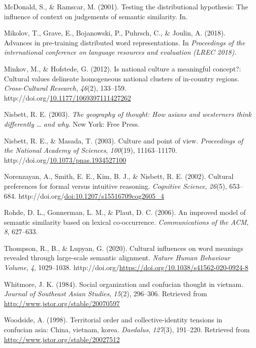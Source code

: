 \documentclass[10pt, letterpaper]{article}
\newenvironment{CSLReferences}%
  {}%
  {\par}
\begin{document}
\begin{CSLReferences}{1}{0}
\leavevmode{}%
McDonald, S., \& Ramscar, M. (2001). Testing the distributional
hypothesis: The influence of context on judgements of semantic
similarity. In.

\leavevmode{}%
Mikolov, T., Grave, E., Bojanowski, P., Puhrsch, C., \& Joulin, A.
(2018). Advances in pre-training distributed word representations. In
\emph{Proceedings of the international conference on language resources
and evaluation (LREC 2018)}.

\leavevmode{}%
Minkov, M., \& Hofstede, G. (2012). Is national culture a meaningful
concept?: Cultural values delineate homogeneous national clusters of
in-country regions. \emph{Cross-Cultural Research}, \emph{46}(2),
133--159.
http://doi.org/\href{https://doi.org/10.1177/1069397111427262}{10.1177/1069397111427262}

\leavevmode{}%
Nisbett, R. E. (2003). \emph{The geography of thought: How asians and
westerners think differently {\ldots{}} and why}. New York: Free Press.

\leavevmode{}%
Nisbett, R. E., \& Masada, T. (2003). Culture and point of view.
\emph{Proceedings of the National Academy of Sciences}, \emph{100}(19),
11163--11170.
http://doi.org/\href{https://doi.org/10.1073/pnas.1934527100}{10.1073/pnas.1934527100}

\leavevmode{}%
Norenzayan, A., Smith, E. E., Kim, B. J., \& Nisbett, R. E. (2002).
Cultural preferences for formal versus intuitive reasoning.
\emph{Cognitive Science}, \emph{26}(5), 653--684.
http://doi.org/\href{https://doi.org/doi:10.1207/s15516709cog2605_4}{doi:10.1207/s15516709cog2605\_4}

\leavevmode{}%
Rohde, D. L., Gonnerman, L. M., \& Plaut, D. C. (2006). An improved
model of semantic similarity based on lexical co‐occurrence.
\emph{Communications of the ACM}, \emph{8}, 627--633.

\leavevmode{}%
Thompson, R., B., \& Lupyan, G. (2020). Cultural influences on word
meanings revealed through large-scale semantic alignment. \emph{Nature
Human Behaviour Volume}, \emph{4}, 1029--1038.
http://doi.org/\url{https://doi.org/10.1038/s41562-020-0924-8}

\leavevmode{}%
Whitmore, J. K. (1984). Social organization and confucian thought in
vietnam. \emph{Journal of Southeast Asian Studies}, \emph{15}(2),
296--306. Retrieved from \url{http://www.jstor.org/stable/20070597}

\leavevmode{}%
Woodside, A. (1998). Territorial order and collective-identity tensions
in confucian asia: China, vietnam, korea. \emph{Daedalus},
\emph{127}(3), 191--220. Retrieved from
\url{http://www.jstor.org/stable/20027512}

\end{CSLReferences}


\end{document}
